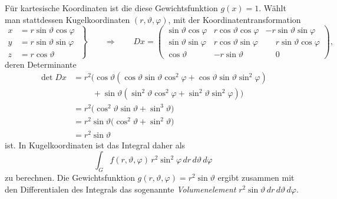 Für kartesische Koordinaten ist die diese Gewichtsfunktion $g(x)=1$.
Wählt man stattdessen Kugelkoordinaten $(r,\vartheta,\varphi)$, mit der
Koordinatentransformation
\begin{equation}
\left.
\begin{aligned}
x&=r\sin\vartheta\cos\varphi\\
y&=r\sin\vartheta\sin\varphi\\
z&=r\cos\vartheta
\end{aligned}
\;\right\}
\qquad
\Rightarrow
\qquad
Dx
=
\begin{pmatrix}
\sin\vartheta\cos\varphi
	&  r \cos\vartheta\cos\varphi
		& -r\sin\vartheta\sin\varphi\\
\sin\vartheta\sin\varphi
	&  r \cos\vartheta\sin\varphi
		& \phantom{-}r\sin\vartheta\cos\varphi\\
\cos\vartheta
	& -r \sin\vartheta
		& \phantom{-}0
\end{pmatrix},
\end{equation}
deren Determinante
\begin{align*}
\det Dx
&=
r^2\bigl(
\cos\vartheta
(\cos\vartheta \sin\vartheta \cos^2\varphi
+
\cos\vartheta \sin\vartheta \sin^2\varphi
)
\\
&\phantom{=}
\quad
+
\sin\vartheta
(
\sin^2\vartheta \cos^2\varphi
+
\sin^2\vartheta \sin^2\varphi
)
\bigr)
\\
&=
r^2\bigl(
\cos^2\vartheta\sin\vartheta
+
\sin^3\vartheta
\bigr)
\\
&=
r^2
\sin\vartheta
\bigl(
\cos^2\vartheta
+
\sin^2\vartheta
\bigr)
\\
&=
r^2\sin\vartheta
\end{align*}
ist.
In Kugelkoordinaten ist das Integral daher als
\[
\int_G f(r,\vartheta,\varphi)
\,
r^2\sin^2\varphi
\,dr\,d\vartheta\,d\varphi
\]
zu berechnen.
Die Gewichtsfunktion $g(r,\vartheta,\varphi)=r^2\sin\vartheta$ ergibt
zusammen mit den Differentialen des Integrals das sogenannte
{\em Volumenelement}
\(
r^2\sin\vartheta\,dr\,d\vartheta\,d\varphi
\).
%

%
%
